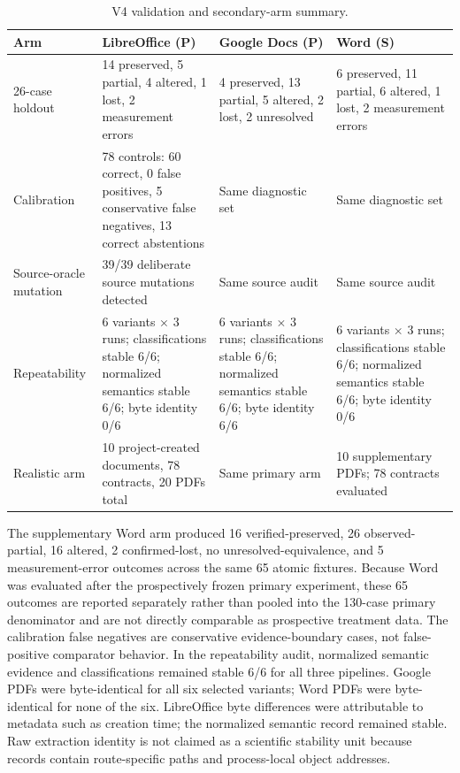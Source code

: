 \begin{table}[t]
\centering\footnotesize
\caption{V4 validation and secondary-arm summary.}
\label{tab:checks}
\begin{tabular}{p{}p{}p{}p{}}
\toprule
Arm & LibreOffice (P) & Google Docs (P) & Word (S) \\
\midrule
26-case holdout & 14 preserved, 5 partial, 4 altered, 1 lost, 2 measurement errors & 4 preserved, 13 partial, 5 altered, 2 lost, 2 unresolved & 6 preserved, 11 partial, 6 altered, 1 lost, 2 measurement errors \\
Calibration & 78 controls: 60 correct, 0 false positives, 5 conservative false negatives, 13 correct abstentions & Same diagnostic set & Same diagnostic set \\
Source-oracle mutation & 39/39 deliberate source mutations detected & Same source audit & Same source audit \\
Repeatability & 6 variants $\times$ 3 runs; classifications stable 6/6; normalized semantics stable 6/6; byte identity 0/6 & 6 variants $\times$ 3 runs; classifications stable 6/6; normalized semantics stable 6/6; byte identity 6/6 & 6 variants $\times$ 3 runs; classifications stable 6/6; normalized semantics stable 6/6; byte identity 0/6 \\
Realistic arm & 10 project-created documents, 78 contracts, 20 PDFs total & Same primary arm & 10 supplementary PDFs; 78 contracts evaluated \\
\bottomrule
\end{tabular}
\end{table}

The supplementary Word arm produced 16 verified-preserved, 26 observed-partial, 16 altered, 2 confirmed-lost, no unresolved-equivalence, and 5 measurement-error outcomes across the same 65 atomic fixtures. Because Word was evaluated after the prospectively frozen primary experiment, these 65 outcomes are reported separately rather than pooled into the 130-case primary denominator and are not directly comparable as prospective treatment data. The calibration false negatives are conservative evidence-boundary cases, not false-positive comparator behavior. In the repeatability audit, normalized semantic evidence and classifications remained stable 6/6 for all three pipelines. Google PDFs were byte-identical for all six selected variants; Word PDFs were byte-identical for none of the six. LibreOffice byte differences were attributable to metadata such as creation time; the normalized semantic record remained stable. Raw extraction identity is not claimed as a scientific stability unit because records contain route-specific paths and process-local object addresses.

